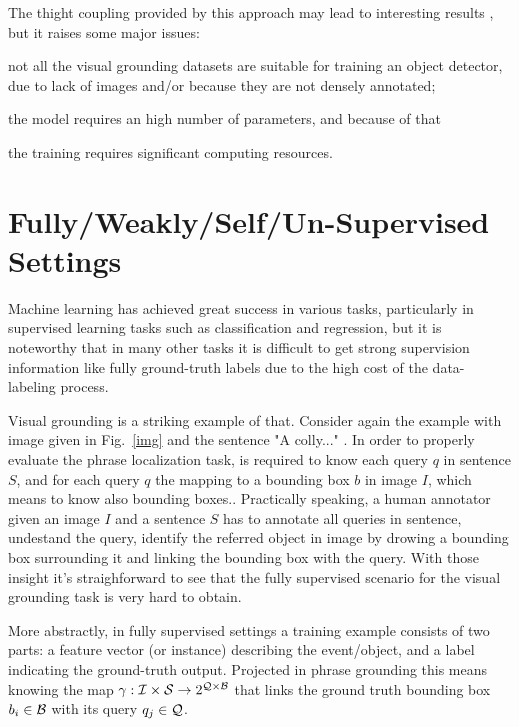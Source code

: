 The thight coupling provided by this approach may lead to interesting
results , but it raises some
major issues: \begin{enumerate*}[label=(\roman*)] \item not all the
visual grounding datasets are suitable for training an object
detector, due to lack of images and/or because they are not densely
annotated; \item the model requires an high number of parameters, and
because of that \item the training requires significant computing
resources. \end{enumerate*}

\section{Fully/Weakly/Self/Un-Supervised Settings}

Machine learning has achieved great success in various tasks,
particularly in supervised learning tasks such as classification and
regression, but it is noteworthy that in many other tasks it is
difficult to get strong supervision information like fully
ground-truth labels due to the high cost of the data-labeling process.

Visual grounding is a striking example of that. Consider again the
example with image given in Fig.~\ref{img} and the sentence "A
colly..." .
 In order to properly
evaluate the phrase localization task, is required to know each query
$q$  in sentence $S$, and for each query
$q$ the mapping to a bounding box $b$ in image $I$, which means to
know also bounding boxes.. Practically
speaking, a human annotator given an image $I$ and a sentence $S$ has
to annotate all queries in sentence, undestand the query, identify the
referred object in image by drowing a bounding box surrounding it and
linking the bounding box with the query. With those insight it's
straighforward to see that the fully supervised scenario for the
visual grounding task is very hard to obtain. 

More abstractly, in fully supervised settings a training example
consists of two parts: a feature vector (or instance) describing the
event/object, and a label indicating the ground-truth output.
Projected in phrase grounding this means knowing the map $\gamma :
\mathcal{I} \times \mathcal{S} \rightarrow 2^{\mathcal{Q} \times \mathcal{B}}$ that links the
ground truth bounding box $b_i \in \mathcal{B}$ with its query $q_j \in
\mathcal{Q}$.

